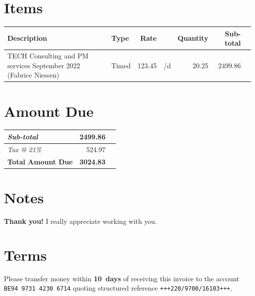 \documentclass[a4paper,table]{article}
\begin{document}
\vspace{66mm}

\section*{Items}
\label{sec:org817eebe}

\extrarowsep=1mm

\begin{table}[!htbp]
\label{tab:orge09cfa6}
\centering
\begin{tabu}{Xlrlrrl}
\rowfont{\bfseries} Description & Type & Rate &  & Quantity & Sub-total\\
\hline
TECH Consulting and PM services September 2022 (Fabrice Niessen) & Timed & 123.45 & \texteuro{}/d & 20.25 & 2499.86\\
\end{tabu}
\end{table}

\section*{Amount Due}
\label{sec:org3fc4574}

\hfill\colorbox{prlp-gray96}{\begin{minipage}{7.5cm}
\begin{center}
\begin{tabu}{Xrl}
\emph{Sub-total} & 2499.86 & \texteuro{}\\
\hline
\emph{Tax @ 21\%} & 524.97 & \texteuro{}\\
\hline
\textbf{Total Amount Due} & \textbf{\large 3024.83} & \textbf{\texteuro{}}\\
\end{tabu}
\end{center}

\end{minipage}}

\section*{Notes}
\label{sec:org9dbedd8}
{\Fontskrivan\large
\textbf{Thank you!}  I really appreciate working with you.
}

\section*{Terms}
\label{sec:org0a7244b}

Please transfer money within \textbf{10~days} of receiving this invoice to the account
\lstinline|BE94 9731 4230 6714| quoting structured reference \lstinline|+++220/9700/16103+++|.
\end{document}
